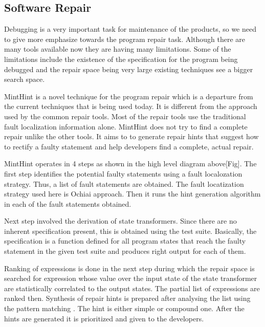 \documentclass[10pt, conference, compsocconf]{IEEEtran}
\begin{document}
\subsection{Software Repair}
Debugging is a very important task for maintenance of the products, so we need to give more emphasize towards the program repair task. Although there are many tools available now they are having many limitations. Some of the limitations include the existence of the specification for the program being debugged and the repair space being very large existing techniques see a bigger search space.

MintHint\cite{kaleeswaran2013minthint} is a novel technique for the program repair which is a departure from the current techniques that is being used today. It is different from the approach used by the common repair tools. Most of the repair tools use the traditional fault localization information alone. MintHint does not try to find a complete repair unlike the other tools. It aims to to generate repair hints that suggest how to rectify a faulty statement and help developers find a complete, actual repair\cite{kaleeswaran2013minthint}. 


MintHint operates in 4 steps as shown in the high level diagram above[Fig]. The first step identifies the potential faulty statements using a fault localozation strategy. Thus, a list of fault statements are obtained. The fault locatization strategy used here is Ochiai approach\cite{janssen2009zoltar}. Then it runs the hint generation algorithm in each of the fault statements obtained.

Next step involved the derivation of state transformers. Since there are no inherent specification present, this is obtained using the test suite. Basically, the specification is a function defined for all program states that reach the faulty statement in the given test suite and produces right output for each of them.

Ranking of expressions is done in the next step during which the repair space is searched for expression whose value over the input state of the state transformer are statistically correlated to the output states. The partial list of expressions are ranked then.
Synthesis of repair hints is prepared after analysing the list using the pattern matching . The hint is either simple or compound one.
After the hints are generated it is prioritized and given to the developers.
\end{document}
